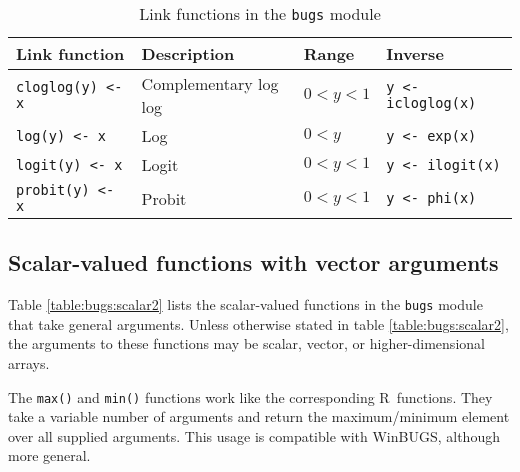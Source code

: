 \documentclass[11pt, a4paper, titlepage]{report}
\newcommand{\WinBUGS}{\textsf{WinBUGS}}
\newcommand{\R}{\textsf{R}}
\begin{document}
\begin{table}
\begin{center}
\begin{tabular}{llll}
\hline
Link function         & Description & Range & Inverse \\
\hline
\verb+cloglog(y) <- x+ & Complementary log log & $0 < y < 1$ & \verb+y <- icloglog(x)+ \\
\verb+log(y) <- x+    & Log           & $0 < y$ &  \verb+y <- exp(x)+ \\
\verb+logit(y) <- x+  & Logit         & $0 < y < 1$ &  \verb+y <- ilogit(x)+ \\
\verb+probit(y) <- x+ & Probit        & $0 < y < 1$ &  \verb+y <- phi(x)+\\
\hline
\end{tabular}
\caption{Link functions in the \texttt{bugs} module \label{table:bugs:link}}
\end{center}
\end{table}

\subsection{Scalar-valued functions with vector arguments}

Table \ref{table:bugs:scalar2} lists the scalar-valued functions in the
\texttt{bugs} module that take general arguments. Unless otherwise
stated in table \ref{table:bugs:scalar2}, the arguments to these functions
may be scalar, vector, or higher-dimensional arrays.

The \verb+max()+ and \verb+min()+ functions work like the
corresponding \R\ functions. They take a variable number of arguments
and return the maximum/minimum element over all supplied
arguments. This usage is  compatible with \WinBUGS, although more general.
\end{document}
